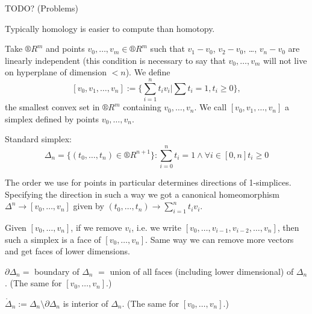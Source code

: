 \documentclass[12pt]{article}					%
\begin{document}

TODO? (Problems)


\begin{poznamka}
	Typically homology is easier to compute than homotopy.
\end{poznamka}

\begin{definice}
	Take $®R^m$ and points $v_0, …, v_m \in ®R^m$ such that $v_1 - v_0$, $v_2 - v_0$, …, $v_n - v_0$ are linearly independent (this condition is necessary to say that $v_0, …, v_m$ will not live on hyperplane of dimension $< n$). We define
	$$ [v_0, v_1, …, v_n] := \{\sum_{i=1}^n t_i v_i | \sum t_i = 1, t_i ≥ 0\}, $$
	the smallest convex set in $®R^m$ containing $v_0, …, v_n$. We call $[v_0, v_1, …, v_n]$ a simplex defined by points $v_0, …, v_n$.

	Standard simplex:
	$$ Δ_n = \{(t_0, …, t_n) \in ®R^{n+1}\}: \sum_{i=0}^n t_i = 1 \land \forall i \in [0, n] t_i ≥ 0 $$

	The order we use for points in particular determines directions of 1-simplices. Specifying the direction in such a way we got a canonical homeomorphism $Δ^n \rightarrow [v_0, …, v_n]$ given by $(t_0, …, t_n) \rightarrow \sum_{i=1}^n t_i v_i$.
\end{definice}

\begin{definice}
	Given $[v_0, …, v_n]$, if we remove $v_i$, i.e. we write $[v_0, …, v_{i-1}, v_{i-2}, …, v_n]$, then such a simplex is a face of $[v_0, …, v_n]$. Same way we can remove more vectors and get faces of lower dimensions.

	$\partial Δ_n =$ boundary of $Δ_n$ $=$ union of all faces (including lower dimensional) of $Δ_n$. (The same for $[v_0, …, v_n]$.)

	$\mathring Δ_n := Δ_n \setminus \partial Δ_n$ is interior of $Δ_n$. (The same for $[v_0, …, v_n]$.)
\end{definice}
\end{document}
